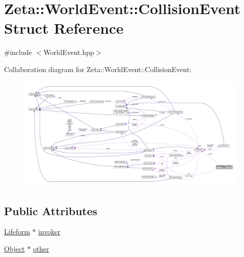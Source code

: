 \hypertarget{structZeta_1_1WorldEvent_1_1CollisionEvent}{\section{Zeta\+:\+:World\+Event\+:\+:Collision\+Event Struct Reference}
\label{structZeta_1_1WorldEvent_1_1CollisionEvent}
}


{\ttfamily \#include $<$World\+Event.\+hpp$>$}



Collaboration diagram for Zeta\+:\+:World\+Event\+:\+:Collision\+Event\+:
\nopagebreak
\begin{figure}[H]
\begin{center}
\leavevmode
\includegraphics[width=350pt]{structZeta_1_1WorldEvent_1_1CollisionEvent__coll__graph}
\end{center}
\end{figure}
\subsection*{Public Attributes}
\begin{DoxyCompactItemize}
\item 
\hyperlink{classZeta_1_1Lifeform}{Lifeform} $\ast$ \hyperlink{structZeta_1_1WorldEvent_1_1CollisionEvent_aaf69fb5dd0c843c4cd2ee87f0ab43010}{invoker}
\item 
\hyperlink{classZeta_1_1Object}{Object} $\ast$ \hyperlink{structZeta_1_1WorldEvent_1_1CollisionEvent_ac9b2b1215997c379ef4329e4548a977d}{other}
\end{DoxyCompactItemize}


